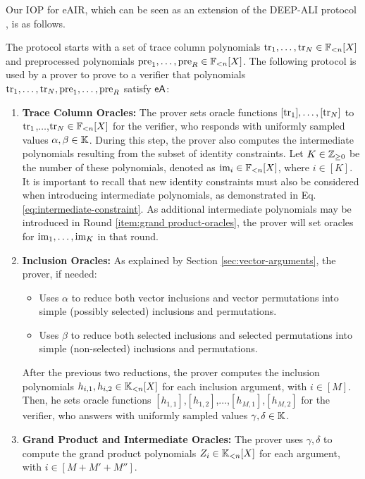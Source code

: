 Our IOP for eAIR, which can be seen as an extension of the DEEP-ALI protocol \cite{EPRINT:BGKS19}, is as follows.
\begin{protocol}\label{prot:IOP-eAIR}
  The protocol starts with a set of trace column polynomials $\text{tr}_1,\dots,\text{tr}_N \in \mathbb{F}_{<n}[X]$ and preprocessed polynomials $\text{pre}_1,\dots,\text{pre}_R \in \mathbb{F}_{<n}[X]$. The following protocol is used by a prover to prove to a verifier that polynomials $\text{tr}_1,\dots,\text{tr}_N,\text{pre}_1,\dots,\text{pre}_R$ satisfy $\textsf{eA}$:
\begin{enumerate}
  \item \textbf{Trace Column Oracles:} The prover sets oracle functions $[\text{tr}_1],\dots,[\text{tr}_N]$ to $\text{tr}_1$,$\dots$,$\text{tr}_N \in \mathbb{F}_{<n}[X]$ for the verifier, who responds with uniformly sampled values $\alpha,\beta \in \mathbb{K}$. During this step, the prover also computes the intermediate polynomials resulting from the subset of identity constraints. Let $K \in \mathbb{Z}_{\geq 0}$ be the number of these polynomials, denoted as $\text{im}_i \in \mathbb{F}_{<n}[X]$, where $i \in [K]$. It is important to recall that new identity constraints must also be considered when introducing intermediate polynomials, as demonstrated in Eq. \eqref{eq:intermediate-constraint}. As additional intermediate polynomials may be introduced in Round \ref{item:grand product-oracles}, the prover will set oracles for $\text{im}_1,\dots,\text{im}_K$ in that round. \label{item:execution-trace-oracles}

  \item \textbf{Inclusion Oracles:} As explained by Section \ref{sec:vector-arguments}, the prover, if needed:
  \begin{itemize}
    \item Uses $\alpha$ to reduce both vector inclusions and vector permutations into simple (possibly selected) inclusions and permutations.
    \item Uses $\beta$ to reduce both selected inclusions and selected permutations into simple (non-selected) inclusions and permutations.
  \end{itemize}
  
  After the previous two reductions, the prover computes the inclusion polynomials $h_{i,1},h_{i,2} \in \mathbb{K}_{<n}[X]$ for each inclusion argument, with $i \in [M]$. Then, he sets oracle functions $[h_{1,1}]$,$[h_{1,2}]$,$\dots$,$[h_{M,1}]$,$[h_{M,2}]$ for the verifier, who answers with uniformly sampled values $\gamma,\delta \in \mathbb{K}$. \label{item:plookup-oracles}
  
  \item \textbf{Grand Product and Intermediate Oracles:} The prover uses $\gamma,\delta$ to compute the grand product polynomials $Z_i \in \mathbb{K}_{<n}[X]$ for each argument, with $i \in [M+M'+M'']$.
  

\end{enumerate}
\end{protocol}
